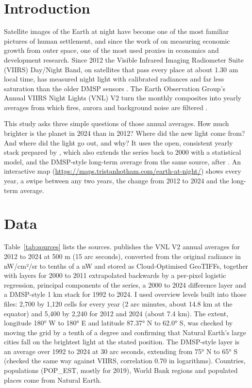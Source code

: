 \documentclass[11pt,a4paper]{article}
\begin{document}
\section{Introduction}
Satellite images of the Earth at night have become one of the most familiar pictures of human settlement, and since the work of \citet{henderson} on measuring economic growth from outer space, one of the most used proxies in economics and development research. Since 2012 the Visible Infrared Imaging Radiometer Suite (VIIRS) Day/Night Band, on satellites that pass every place at about 1.30 am local time, has measured night light with calibrated radiances and far less saturation than the older DMSP sensors \citep{elvidge2017}. The Earth Observation Group's Annual VIIRS Night Lights (VNL) V2 turn the monthly composites into yearly averages from which fires, aurora and background noise are filtered \citep{elvidge2021}.

This study asks three simple questions of those annual averages. How much brighter is the planet in 2024 than in 2012? Where did the new light come from? And where did the light go out, and why? It uses the open, consistent yearly stack prepared by \citet{hengl}, which also extends the series back to 2000 with a statistical model, and the DMSP-style long-term average from the same source, after \citet{li2020}. An interactive map (\url{https://maps.tristanhotham.com/earth-at-night/}) shows every year, a swipe between any two years, the change from 2012 to 2024 and the long-term average.

\section{Data}
Table~\ref{tab:sources} lists the sources. \citet{hengl} publishes the VNL V2 annual averages for 2012 to 2024 at 500 m (15 arc seconds), converted from the original radiance in nW/cm²/sr to tenths of a nW and stored as Cloud-Optimised GeoTIFFs, together with layers for 2000 to 2011 extrapolated backwards by a per-pixel logistic regression, principal components of the series, a 2000 to 2024 difference layer and a DMSP-style 1 km stack for 1992 to 2024. I used overview levels built into those files: 2,700 by 1,120 cells for every year (2 arc minutes, about 14.8 km at the equator) and 5,400 by 2,240 for 2012 and 2024 (about 7.4 km). The extent, longitude 180° W to 180° E and latitude 87.37° N to 62.0° S, was checked by moving the grid by a tenth of a degree and confirming that Natural Earth's large cities fall on the brightest light at the stated position. The DMSP-style layer is an average over 1992 to 2024 at 30 arc seconds, extending from 75° N to 65° S (checked the same way against VIIRS, correlation 0.70 in logarithms). Countries, populations (POP\_EST, mostly for 2019), World Bank regions and populated places come from Natural Earth.
\end{document}
